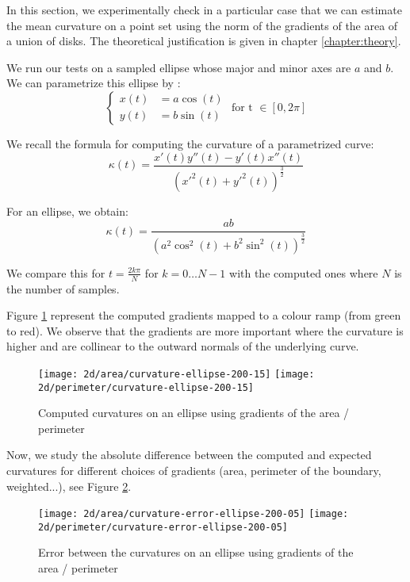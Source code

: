 In this section, we experimentally check in a particular case that we can
estimate the mean curvature on a point set using the norm of the gradients of
the area of a union of disks. The theoretical justification is given in chapter
\ref{chapter:theory}.

We run our tests on a sampled ellipse whose major and minor axes are $ a $ and $
b $. We can parametrize this ellipse by :
$$
\begin{cases}
    x(t) &= a \cos (t) \\
    y(t) &= b \sin (t)
\end{cases}
\text{ for t } \in [ 0, 2\pi ]
$$

We recall the formula for computing the curvature of a parametrized curve:
\begin{equation}
    \kappa(t) = \frac{x'(t) y''(t) - y'(t) x''(t)}{(x'^2(t) +
        y'^2(t))^{\frac{3}{2}} }
\end{equation}

For an ellipse, we obtain:
$$ \kappa(t) = \frac{ab}{(a^2 \cos^2(t) + b^2 \sin^2(t))^{\frac{3}{2}} } $$

We compare this for $ t = \frac{2 k \pi}{N} $ for $ k = 0 \ldots N - 1 $ with
the computed ones where $ N $ is the number of samples.

Figure \ref{fig:2d-curvature-ellipse} represent the computed gradients mapped
to a colour ramp (from green to red). We observe that the gradients are more
important where the curvature is higher and are collinear to the outward normals
of the underlying curve.

\begin{figure}[h]
    \centering

    \texttt{[image: 2d/area/curvature-ellipse-200-15]}
    \texttt{[image: 2d/perimeter/curvature-ellipse-200-15]}
    \caption{Computed curvatures on an ellipse using gradients of the area /
        perimeter}
    \label{fig:2d-curvature-ellipse}
\end{figure}


Now, we study the absolute difference between the computed and expected
curvatures for different choices of gradients (area, perimeter of the boundary,
weighted...), see Figure \ref{fig:2d-curvature-error-ellipse}.

\begin{figure}[h]
    \centering

    \texttt{[image: 2d/area/curvature-error-ellipse-200-05]}
    \texttt{[image: 2d/perimeter/curvature-error-ellipse-200-05]}
    \caption{Error between the curvatures on an ellipse using gradients of the
        area / perimeter}
    \label{fig:2d-curvature-error-ellipse}
\end{figure}

